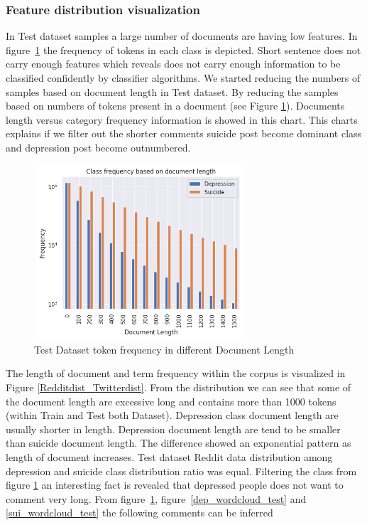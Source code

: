 \documentclass[sn-mathphys,Numbered]{sn-jnl}%
\theoremstyle{thmstyleone}%
\theoremstyle{thmstyletwo}%
\theoremstyle{thmstylethree}%
\begin{document}
\subsubsection{Feature distribution visualization}
In Test dataset samples a large number of documents are having low features. In figure~\ref{fig_Test_Dataset_token_frequency} the frequency of tokens in each class is depicted. Short sentence does not carry enough features which reveals does not carry enough information to be classified confidently by classifier algorithms. We started reducing the numbers of samples based on document length in Test dataset. By reducing the samples based on numbers of tokens present in a document (see Figure \ref{fig_Test_Dataset_token_frequency}). Documents length versus category frequency information is showed in this chart. This charts explains if we filter out the shorter comments suicide post become dominant class and depression post become outnumbered. 
%
\begin{figure}[H]
\centering
\includegraphics[height=6.5cm, width=0.7\textwidth]{doc_len.png}
\caption{Test Dataset token frequency in different Document Length}
\label{fig_Test_Dataset_token_frequency}
\end{figure}
%
The length of document and term frequency within the corpus is visualized in Figure \ref{Redditdist_Twitterdist}. From the distribution we can see that some of the document length are excessive long and contains more than 1000 tokens (within Train and Test both Dataset). Depression class document length are usually shorter in length. Depression document length are tend to be smaller than suicide document length. The difference showed an exponential pattern as length of document increases. Test dataset Reddit data distribution among depression and suicide class distribution ratio was equal. Filtering the class from figure \ref{fig_Test_Dataset_token_frequency} an interesting fact is revealed that depressed people does not want to comment very long. From figure~\ref{fig_Test_Dataset_token_frequency},  figure~\ref{dep_wordcloud_test} and \ref{sui_wordcloud_test} the following comments can be inferred
\end{document}
